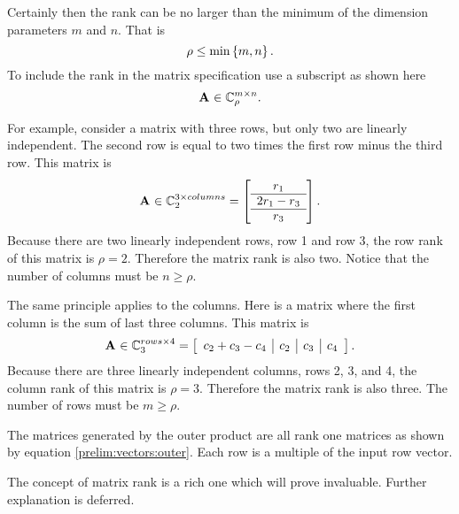 Certainly then the rank can be no larger than the minimum of the dimension parameters $m$ and $n$. That is
\begin{equation}
  \rho \le \min \lst{m,n}.
\end{equation}
To include the rank in the matrix specification use a subscript as shown here
\begin{equation}
  \A{}\in\cmplx{\by{m}{n}}_{\rho}.
\end{equation}

For example, consider a matrix with three rows, but only two are linearly independent. The second row is equal to two times the first row minus the third row. This matrix is
\begin{equation}
  \A{}\in\cmplx{\by{3}{columns}}_{2} = \mat{c}
  {
  r_{1}\\ \hline
  2r_{1}-r_{3}\\ \hline
  r_{3}
  }.
\end{equation}
Because there are two linearly independent rows, row 1 and row 3, the row rank of this matrix is $\rho = 2$. Therefore the matrix rank is also two. Notice that the number of columns must be $n \ge \rho$. 

The same principle applies to the columns. Here is a matrix where the first column is the sum of last three columns. This matrix is
\begin{equation}
  \A{}\in\cmplx{\by{rows}{4}}_{3} = \mat{c|c|c|c}
  {
  c_{2}+c_{3}-c_{4} & c_{2} & c_{3} & c_{4}
  }.
\end{equation}
Because there are three linearly independent columns, rows 2, 3, and 4, the column rank of this matrix is $\rho = 3$. Therefore the matrix rank is also three. The number of rows must be $m \ge \rho$.

The matrices generated by the outer product are all rank one matrices as shown by equation \eqref{prelim:vectors:outer}. Each row is a multiple of the input row vector.

The concept of matrix rank is a rich one which will prove invaluable. Further explanation is deferred.

